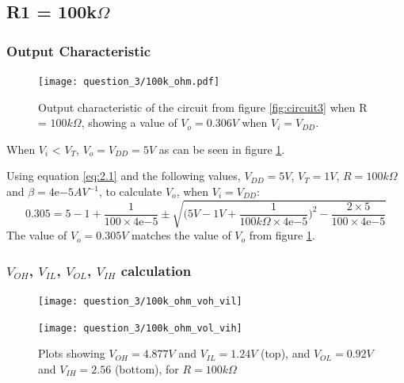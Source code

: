 \documentclass[11pt, a4paper]{article}
\begin{document}
\FloatBarrier
\subsection{R1 = 100k$\Omega$}
\subsubsection{Output Characteristic}

\begin{figure}[h]
  \centering
  \texttt{[image: question\_3/100k\_ohm.pdf]}
  \caption{\centering Output characteristic of the circuit from figure \ref{fig:circuit3} when R = $100k \Omega$, showing a value of $V_o = 0.306V$ when $V_i = V_{DD}$.}
    \label{fig:9}
\end{figure}


When $V_i$ < $V_T$, $V_o = {V_{DD}} = 5V$ as can be seen in figure \ref{fig:9}.

Using equation \ref{eq:2.1} and the following values, $V_{DD} = 5V$, $V_T = 1V$, $R = 100k\Omega$ and
$\beta = 4\mathrm{e}{-5} AV^{-1}$, to calculate $V_o$, when $V_i = V_{DD}$:
\begin{equation}
  0.305 = 5 - 1 + \frac{1}{100 \times 4\mathrm{e}{-5} } \pm \sqrt{\bigg(5V - 1V + \frac{1}{100k \Omega \times 4\mathrm{e}{-5}} \bigg)^2 - \frac{2 \times 5}{100 \times 4\mathrm{e}{-5}}}
  \label{eq:2}
\end{equation}
The value of $V_o = 0.305V$ matches the value of $V_o$ from figure \ref{fig:9}.

\FloatBarrier
\subsubsection{$V_{OH}$, $V_{IL}$, $V_{OL}$, $V_{IH}$ calculation}

\begin{figure}
  \centering
  \begin{minipage}{0.7\textwidth}
      \centering
      \texttt{[image: question\_3/100k\_ohm\_voh\_vil]} %
  \end{minipage}\vfill
  \begin{minipage}{0.7\textwidth}
      \centering
      \texttt{[image: question\_3/100k\_ohm\_vol\_vih]} %
  \end{minipage}
  \caption{\centering Plots showing $V_{OH} = 4.877V$ and $V_{IL} = 1.24V$ (top), and $V_{OL} = 0.92V$ and
   $V_{IH} = 2.56$ (bottom), for $R = 100k\Omega$}  
   \label{fig:10}
\end{figure}
\end{document}

